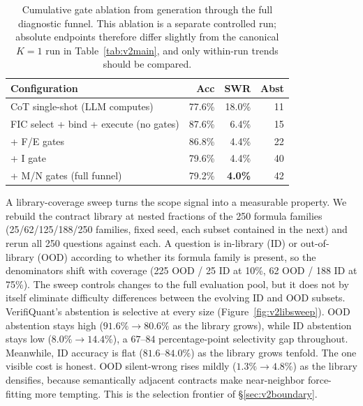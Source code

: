 \documentclass[sigconf,anonymous]{acmart}
\newcommand{\vqSWRMed}{2.8\%}
\newcommand{\vqSWRHard}{4.3\%}
\newcommand{\vqSWRatioMed}{5.0$\times$}
\newcommand{\vqSWRatioHard}{6.7$\times$}
\newcommand{\cotSWRMed}{13.9\%}
\newcommand{\cotSWRHard}{28.6\%}
\begin{document}
\begin{table}[t]
\caption{Cumulative gate ablation from generation through the full diagnostic funnel. This ablation is a separate controlled run; absolute endpoints therefore differ slightly from the canonical $K{=}1$ run in Table~\ref{tab:v2main}, and only within-run trends should be compared.}
\label{tab:v2gateladder}
\small
\begin{tabular}{@{}lrrr@{}}
\toprule
Configuration & Acc & SWR & Abst \\
\midrule
CoT single-shot (LLM computes) & 77.6\% & 18.0\% & 11 \\
FIC select + bind + execute (no gates) & 87.6\% & 6.4\% & 15 \\
\quad + F/E gates & 86.8\% & 4.4\% & 22 \\
\quad + I gate & 79.6\% & 4.4\% & 40 \\
\quad + M/N gates (full funnel) & 79.2\% & \textbf{4.0\%} & 42 \\
\bottomrule
\end{tabular}
\end{table}


A library-coverage sweep turns the scope signal into a measurable property.
We rebuild the contract library at nested fractions of the 250 formula families (25/62/125/188/250 families, fixed seed, each subset contained in the next) and rerun all 250 questions against each. A question is in-library (ID) or out-of-library (OOD) according to whether its formula family is present, so the denominators shift with coverage (225 OOD / 25 ID at 10\%, 62 OOD / 188 ID at 75\%).
The sweep controls changes to the full evaluation pool, but it does not by itself eliminate difficulty differences between the evolving ID and OOD subsets.
VerifiQuant's abstention is selective at every size (Figure~\ref{fig:v2libsweep}). OOD abstention stays high ($91.6\%{\to}80.6\%$ as the library grows), while ID abstention stays low ($8.0\%{\to}14.4\%$), a $67$--$84$ percentage-point selectivity gap throughout. Meanwhile, ID accuracy is flat ($81.6$--$84.0\%$) as the library grows tenfold.
The one visible cost is honest. OOD silent-wrong rises mildly ($1.3\%{\to}4.8\%$) as the library densifies, because semantically adjacent contracts make near-neighbor force-fitting more tempting. This is the selection frontier of \S\ref{sec:v2boundary}.
\end{document}
